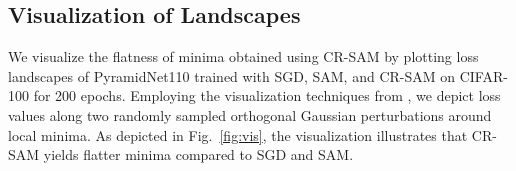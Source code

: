 \documentclass[letterpaper]{article} %
\theoremstyle{plain}
\theoremstyle{definition}
\newcommand{\fref}[1]{Fig.~\ref{#1}}
\newcommand{\tref}[1]{Table~\ref{#1}}
\begin{document}

\begin{table}[h]
  \begin{center}
    \caption{Model geometry of ResNet-18 models trained with SGD, SAM and CR-SAM, values are computed on test set.}
    \label{tab:geometry}
    \vspace{-0.5cm}
  \end{center}
  \end{table}

\subsection{Visualization of Landscapes}
\label{subsec:viz}
We visualize the flatness of minima obtained using CR-SAM by plotting loss landscapes of PyramidNet110 trained with SGD, SAM, and CR-SAM on CIFAR-100 for 200 epochs. Employing the visualization techniques from \cite{li2018visualizing}, we depict loss values along two randomly sampled orthogonal Gaussian perturbations around local minima. As depicted in \fref{fig:vis}, the visualization illustrates that CR-SAM yields flatter minima compared to SGD and SAM.
\end{document}
